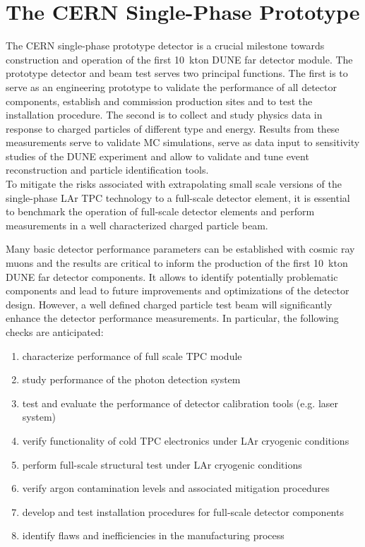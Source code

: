 \section{The CERN Single-Phase Prototype} 
\label{sec:proto-cern-single}


The CERN single-phase prototype detector is a crucial milestone towards construction and operation of the 
first 10~kton DUNE far detector module. The prototype detector and beam test serves two principal functions. 
The first is to serve as an engineering prototype to validate the performance of all detector components,
establish and commission production sites and to test the installation procedure. 
The second is to collect and study physics data in response to charged particles of different type and energy. 
Results from these measurements serve to validate MC simulations, serve as data input to sensitivity studies 
of the DUNE experiment  and allow to validate and tune event reconstruction and particle identification tools.\\
To mitigate the risks associated with extrapolating small scale versions of the single-phase LAr TPC technology 
to a full-scale detector element, it is essential to benchmark the operation of full-scale detector elements
and perform measurements in a well characterized charged particle beam.  


Many basic detector performance parameters can be established with cosmic ray muons and the results are critical to inform 
the production of the first 10~kton DUNE far detector components.
It allows to identify potentially problematic components and lead to future improvements and optimizations of the detector design.
However, a well defined charged particle test beam will significantly enhance the detector performance measurements.
In particular, the following checks are anticipated:
\begin{enumerate}
 \item characterize performance of full scale TPC module
 \item study performance of the photon detection system
 \item test and evaluate the performance of detector calibration tools (e.g. laser system)
  \item verify functionality of cold TPC electronics under LAr cryogenic conditions
  \item perform full-scale structural test under LAr cryogenic conditions
  \item verify argon contamination levels and associated mitigation procedures
  \item develop and test installation procedures for full-scale detector components
  \item identify flaws and inefficiencies in the manufacturing process
\end{enumerate}

